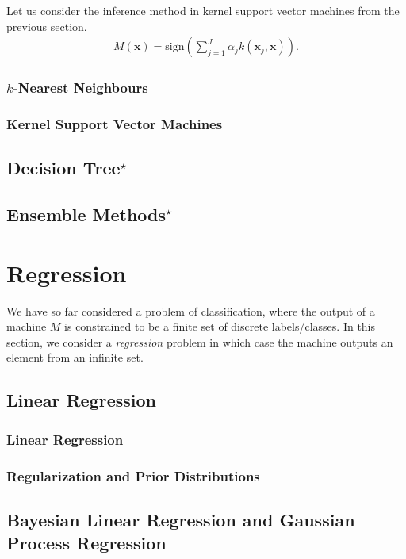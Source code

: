 \documentclass{report}
\newcommand{\vect}[1]{\mathbf{#1}}
\newcommand{\vx}[0]{\vect{x}}
\newcommand{\sign}{\text{sign}}
\begin{document}
Let us consider the inference method in kernel support vector machines from the
previous section. 
\begin{align*}
    M(\vx) = \sign \left(\sum_{j=1}^J \alpha_j k(\vx_j, \vx)\right).
\end{align*}


\subsection{$k$-Nearest Neighbours}


\subsection{Kernel Support Vector Machines}



\section{Decision Tree$^\star$}

\section{Ensemble Methods$^\star$}


\chapter{Regression}
\label{sec:regression}

We have so far considered a problem of classification, where the output of a
machine $M$ is constrained to be a finite set of discrete labels/classes. In
this section, we consider a {\it regression} problem in which case the machine
outputs an element from an infinite set.

\section{Linear Regression}

\subsection{Linear Regression}


\subsection{Regularization and Prior Distributions}


\section{Bayesian Linear Regression and Gaussian Process Regression}
\end{document}

